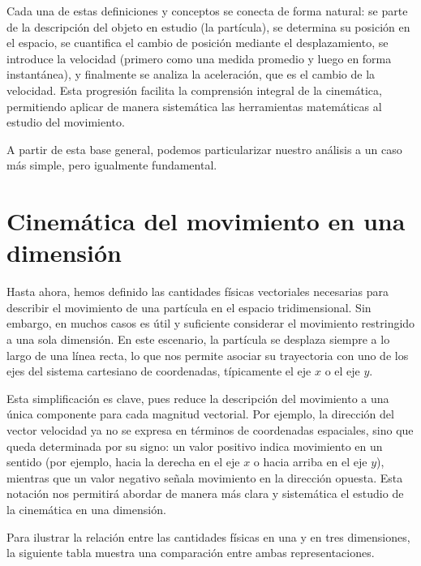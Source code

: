 Cada una de estas definiciones y conceptos se conecta de forma natural: se parte de la descripción del objeto en estudio (la partícula), se determina su posición en el espacio, se cuantifica el cambio de posición mediante el desplazamiento, se introduce la velocidad (primero como una medida promedio y luego en forma instantánea), y finalmente se analiza la aceleración, que es el cambio de la velocidad. Esta progresión facilita la comprensión integral de la cinemática, permitiendo aplicar de manera sistemática las herramientas matemáticas al estudio del movimiento.

A partir de esta base general, podemos particularizar nuestro análisis a un caso más simple, pero igualmente fundamental.

\section{Cinemática del movimiento en una dimensión}  

Hasta ahora, hemos definido las cantidades físicas vectoriales necesarias para describir el movimiento de una partícula en el espacio tridimensional. Sin embargo, en muchos casos es útil y suficiente considerar el movimiento restringido a una sola dimensión. En este escenario, la partícula se desplaza siempre a lo largo de una línea recta, lo que nos permite asociar su trayectoria con uno de los ejes del sistema cartesiano de coordenadas, típicamente el eje $x$ o el eje $y$.  

Esta simplificación es clave, pues reduce la descripción del movimiento a una única componente para cada magnitud vectorial. Por ejemplo, la dirección del vector velocidad ya no se expresa en términos de coordenadas espaciales, sino que queda determinada por su signo: un valor positivo indica movimiento en un sentido (por ejemplo, hacia la derecha en el eje $x$ o hacia arriba en el eje $y$), mientras que un valor negativo señala movimiento en la dirección opuesta. Esta notación nos permitirá abordar de manera más clara y sistemática el estudio de la cinemática en una dimensión.

Para ilustrar la relación entre las cantidades físicas en una y en tres dimensiones, la siguiente tabla muestra una comparación entre ambas representaciones.

